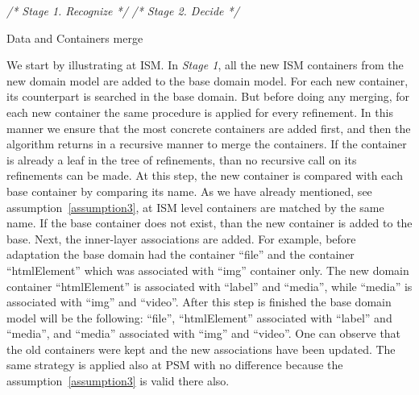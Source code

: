 \documentclass{sig-alternate}
\begin{document}
\IncMargin{1em}
\begin{algorithm}
  \BlankLine
  	\emph{/* Stage 1. Recognize */}\;
  	\emph{/* Stage 2. Decide */}\;
  \caption{Data and Containers merge}\label{algo_dc}
\end{algorithm}
\DecMargin{1em}

We start by illustrating at ISM.
In \textit{Stage 1}, all the new ISM containers from the new domain model are added to the base domain model.
For each new container, its counterpart is searched in the base domain. 
But before doing any merging, for each new container the same procedure is applied for every refinement.
In this manner we ensure that the most concrete containers are added first, and then the algorithm returns in a recursive manner to merge the containers.
If the container is already a leaf in the tree of refinements, than no recursive call on its refinements can be made. 
At this step, the new container is compared with each base container by comparing its name.
As we have already mentioned, see assumption~\ref{assumption3}, at ISM level containers are matched by the same name.
If the base container does not exist, than the new container is added to the base.
Next, the inner-layer associations are added.
For example, before adaptation the base domain had the container ``file'' and the container ``htmlElement'' which was associated with ``img'' container only.
The new domain container ``htmlElement'' is associated with ``label'' and ``media'', while ``media'' is associated with ``img'' and ``video''.
After this step is finished the base domain model will be the following: ``file'', ``htmlElement'' associated with ``label'' and ``media'', and ``media'' associated with ``img'' and ``video''. 
One can observe that the old containers were kept and the new associations have been updated.
The same strategy is applied also at PSM with no difference because the assumption~\ref{assumption3} is valid there also.
\end{document}
